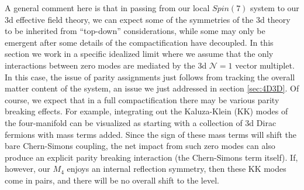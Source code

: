\documentclass[12pt]{article}%
\numberwithin{equation}{section}
\renewcommand{\(}{\left(}
\renewcommand{\)}{\right)}
\renewcommand{\[}{\left[}
\renewcommand{\]}{\right]}
\begin{document}
A general comment here is that in passing from our local $Spin(7)$ system to our 3d effective field theory,
we can expect some of the symmetries of the 3d theory to be inherited from ``top-down'' considerations, while some may only be emergent after some details of the compactification have decoupled. In this section we work in a specific idealized limit where we assume that the only interactions between zero modes are mediated by the 3d $\mathcal{N} = 1$ vector multiplet. In this case, the issue of parity assignments just follows from tracking the overall matter content of the system, an issue we just addressed in section \ref{sec:4D3D}. Of course, we expect that in a full compactification there may be various parity breaking effects. For example, integrating out the Kaluza-Klein (KK) modes of the four-manifold
can be visualized as starting with a collection of 3d Dirac fermions with mass terms added. Since the sign of these mass terms will shift the bare Chern-Simons coupling, the net impact from such zero modes can also produce an explicit parity breaking interaction (the Chern-Simons term itself). If, however, our $M_4$ enjoys an internal reflection symmetry, then these KK modes come in pairs, and there will be no overall shift
to the level.
\end{document}
